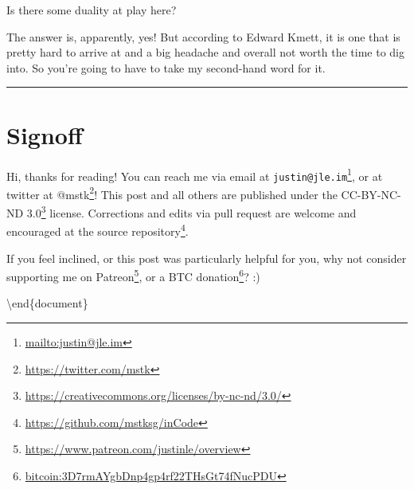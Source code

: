 \documentclass[]{article}
\renewcommand{\href}[2]{#2\footnote{\url{#1}}}
\begin{document}
Is there some duality at play here?

The answer is, apparently, yes! But according to Edward Kmett, it is one that is
pretty hard to arrive at and a big headache and overall not worth the time to
dig into. So you're going to have to take my second-hand word for it.

\begin{center}\rule{0.5\linewidth}{0.5pt}\end{center}

\section{Signoff}\label{signoff}

Hi, thanks for reading! You can reach me via email at
\href{mailto:justin@jle.im}{\nolinkurl{justin@jle.im}}, or at twitter at
\href{https://twitter.com/mstk}{@mstk}! This post and all others are published
under the \href{https://creativecommons.org/licenses/by-nc-nd/3.0/}{CC-BY-NC-ND
3.0} license. Corrections and edits via pull request are welcome and encouraged
at \href{https://github.com/mstksg/inCode}{the source repository}.

If you feel inclined, or this post was particularly helpful for you, why not
consider \href{https://www.patreon.com/justinle/overview}{supporting me on
Patreon}, or a \href{bitcoin:3D7rmAYgbDnp4gp4rf22THsGt74fNucPDU}{BTC donation}?
:)

\textbackslash end\{document\}
\end{document}

